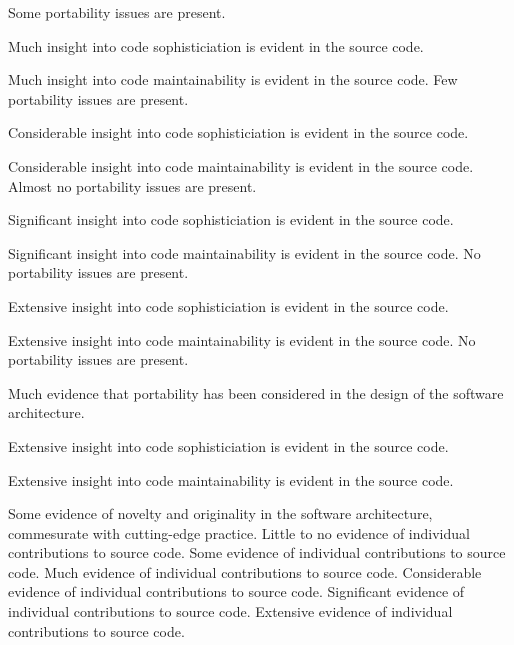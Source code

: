 \documentclass{../../fal_assignment}
\begin{document}
\begin{markingrubric}
        \grade Some portability issues are present.
            \par Much insight into code sophisticiation is evident in the source code.
            \par Much insight into code maintainability is evident in the source code.
        \grade Few portability issues are present.
            \par Considerable insight into code sophisticiation is evident in the source code.
            \par Considerable insight into code maintainability is evident in the source code.
        \grade Almost no portability issues are present.
            \par Significant insight into code sophisticiation is evident in the source code.
            \par Significant insight into code maintainability is evident in the source code.
        \grade No portability issues are present.
            \par Extensive insight into code sophisticiation is evident in the source code.
            \par Extensive insight into code maintainability is evident in the source code.
        \grade No portability issues are present. 
	 \par Much evidence that portability has been considered in the design of the software architecture.
            \par Extensive insight into code sophisticiation is evident in the source code.
            \par Extensive insight into code maintainability is evident in the source code.
            \par Some evidence of novelty and originality in the software architecture, commesurate with cutting-edge practice.
%
        \grade \fail Little to no evidence of individual contributions to source code.
        \grade Some evidence of individual contributions to source code.
        \grade Much evidence of individual contributions to source code.
        \grade Considerable evidence of individual contributions to source code.
        \grade Significant evidence of individual contributions to source code.
        \grade Extensive evidence of individual contributions to source code.
\end{markingrubric}
\end{document}
